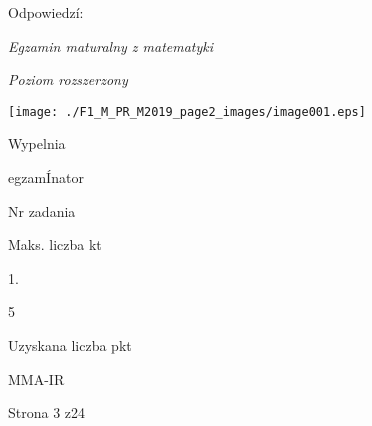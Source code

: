 \documentclass[a4paper,12pt]{article}
\begin{document}
Odpowiedzí:

{\it Egzamin maturalny z matematyki}

{\it Poziom rozszerzony}
\begin{center}
\texttt{[image: ./F1\_M\_PR\_M2019\_page2\_images/image001.eps]}
\end{center}
Wypelnia

egzamÍnator

Nr zadania

Maks. liczba kt

1.

5

Uzyskana liczba pkt

MMA-IR

Strona 3 z24
\end{document}
